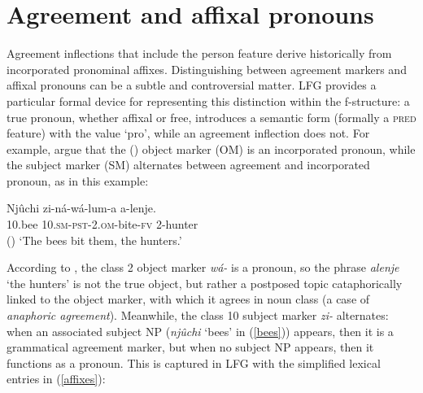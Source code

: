 \section{Agreement and affixal pronouns}
\label{sec:agre-affix-pron}

Agreement inflections that include the person feature derive historically from incorporated pronominal affixes.  Distinguishing between agreement markers and affixal pronouns can be a subtle and controversial matter.  LFG provides a particular formal device for representing this distinction within the f-structure:  a true pronoun, whether affixal or free, introduces a semantic form (formally a \textsc{pred} feature) with the value `{pro}', while an agreement inflection does not.  
For example, \citet{bresnan+mchombo:1987} argue that the  () object marker ({OM}) is an incorporated pronoun, while the subject marker ({SM}) alternates between agreement and incorporated pronoun, as in this example: 


 \begin{exe} 
\ex	\label{bees}
{\gll Nj\^{u}chi   zi-n\'a-w\'{a}-lum-a  a-lenje. \\
 10.bee 10.\textsc{sm}-\textsc{pst}-2.\textsc{om}-bite-\textsc{fv} 2-hunter \\ \hfill ()
\glt `The bees bit them, the hunters.' }
\end{exe}

\noindent
According to \citet[745]{bresnan+mchombo:1987},  the class 2 object marker \textit{w\'{a}-} is a pronoun, so the phrase \textit{alenje} `the hunters' is not the true object, but rather a postposed topic cataphorically linked to the object marker, with which it agrees in noun class (a case of \textit{anaphoric agreement}).  Meanwhile, the class 10 subject marker \textit{zi-} alternates: when an associated subject NP (\textit{njûchi} ‘bees’ in (\ref{bees})) appears, then it is a grammatical agreement marker, but when no subject NP appears, then it functions as a pronoun.  This is captured in LFG with the simplified lexical entries in (\ref{affixes}):

\eal 
 \label{affixes}
 \zl 
 
